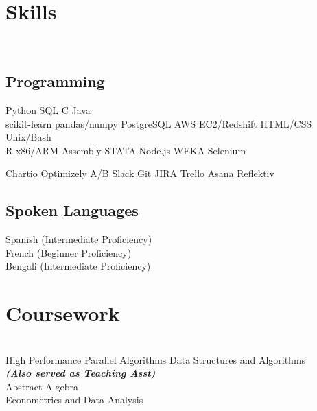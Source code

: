 \documentclass[]{deedy-resume-openfont}
\begin{document}
\begin{minipage}[t]{0.31\textwidth}

\section{Skills}
\\[1\baselineskip]
\subsection{Programming}

Python \textbullet{}  SQL  \textbullet{} C \textbullet{} Java
\\[1\baselineskip]

scikit-learn \textbullet{} 
pandas/numpy
PostgreSQL \textbullet{} 
AWS EC2/Redshift \textbullet{}
HTML/CSS \textbullet{}
Unix/Bash
\\[1\baselineskip]

R \textbullet{} 
x86/ARM Assembly \textbullet{} 
STATA \textbullet{} 
Node.js \textbullet{} 
WEKA \textbullet{} 
Selenium
\sectionsep

Chartio \textbullet{} 
Optimizely A/B \textbullet{} 
Slack \textbullet{} 
Git \textbullet{} 
JIRA \textbullet{} 
Trello \textbullet{} 
Asana \textbullet{} 
Reflektiv
\sectionsep

\subsection{Spoken Languages}
Spanish (Intermediate Proficiency) \\
French (Beginner Proficiency)\\
Bengali (Intermediate Proficiency)\\
[1\baselineskip]


\section{Coursework}
\\[1\baselineskip]
High Performance Parallel Algorithms
Data Structures and Algorithms\\
{\footnotesize \textit{\textbf{(Also served as Teaching Asst) }}} \\
Abstract Algebra\\
Econometrics and Data Analysis\\
\sectionsep



%
%

\end{minipage} 
\end{document}
